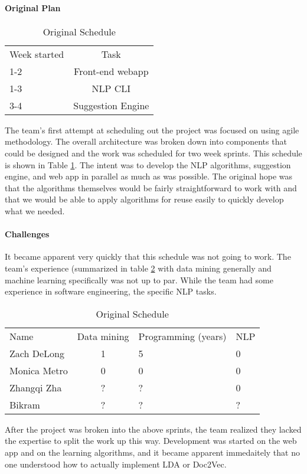 
\paragraph{Original Plan}
\begin{table}[h]
    \caption{Original Schedule}
    \begin{tabular}{ l c }
    Week started & Task \\
    1-2 & Front-end webapp  \\
    1-3 & NLP CLI  \\
    3-4 & Suggestion Engine 
    \end{tabular} \label{sec:devi-from-init-pln:original-timeline}
\end{table}

The team's first attempt at scheduling out the project was focused on
using agile methodology.  
The overall architecture was broken down into components that could be
designed and the work was scheduled for two week sprints.
This schedule is shown in Table
\ref{sec:devi-from-init-pln:original-timeline}.
The intent was to develop the NLP algorithms, suggestion engine, and
web app in parallel as much as was possible.
The original hope was that the algorithms themselves would be fairly
straightforward to work with and that we would be able to apply
algorithms for reuse easily to quickly develop what we needed.

\paragraph{Challenges}
It became apparent very quickly that this schedule was not going to
work.
The team's experience (summarized in table
\ref{sec:devi-from-init-pln:skillsets} with data mining generally and
machine learning specifically was not up to par.
While the team had some experience in software engineering, the
specific NLP tasks.

\begin{table}[h]
    \caption{Original Schedule}
    \begin{tabular}{ l c l l}
    Name & Data mining & Programming (years) & NLP\\
    Zach DeLong & 1 & 5 & 0 \\
    Monica Metro &  0 & 0 & 0 \\
    Zhangqi Zha & ? & ? & 0\\
    Bikram & ? & ? & ?  
    \end{tabular} \label{sec:devi-from-init-pln:skillsets}
\end{table}

After the project was broken into the above sprints, the team realized
they lacked the expertise to split the work up this way.
Development was started on the web app and on the learning algorithms, and it
became apparent immedaitely that no one understood how to actually
implement LDA or Doc2Vec.


